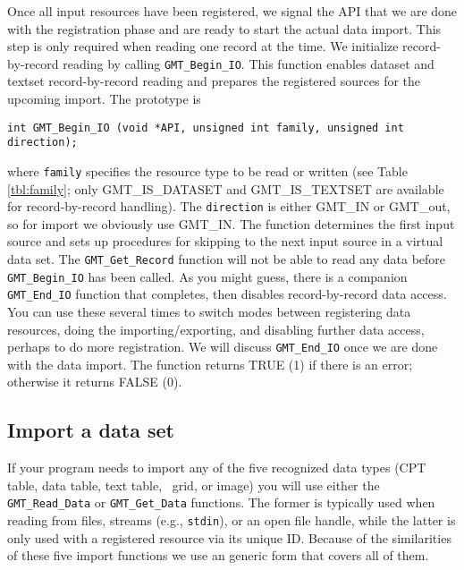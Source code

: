 \documentclass[11pt]{report}
\begin{document}
Once all input resources have been registered, we signal the API that we are done with the registration
phase and are ready to start the actual data import.  This step is only required when reading one record at the
time.  We initialize record-by-record reading by calling \texttt{GMT\_Begin\_IO}.  This function enables dataset
and textset record-by-record reading and prepares the registered sources for the upcoming import.
The prototype is

\begin{verbatim}
int GMT_Begin_IO (void *API, unsigned int family, unsigned int direction);
\end{verbatim}
where \texttt{family} specifies the resource type to be read or written (see Table \ref{tbl:family};
only GMT\_IS\_DATASET and GMT\_IS\_TEXTSET are available for record-by-record handling).
The \texttt{direction} is either GMT\_IN or GMT\_out, so for import we obviously use GMT\_IN.
The function determines the first input source and sets up procedures for skipping to the next input source in a virtual data set.
The \texttt{GMT\_Get\_Record} function will not be able to read any data before \texttt{GMT\_Begin\_IO} has been called.  As you might
guess, there is a companion \texttt{GMT\_End\_IO} function that completes, then disables record-by-record data access.  You can use these several
times to switch modes between registering data resources, doing the importing/exporting, and disabling further
data access, perhaps to do more registration.  We will discuss \texttt{GMT\_End\_IO} once we are done with the data import.
The function returns TRUE (1) if there is an error; otherwise it returns FALSE (0).

\subsection{Import a data set}

If your program needs to import any of the five recognized data types (CPT table, data table, text table, \GMT\ grid, or image)
you will use either the \texttt{GMT\_Read\_Data} or \texttt{GMT\_Get\_Data} functions.  The former is typically used when
reading from files, streams (e.g., \texttt{stdin}), or an open file handle, while the latter is only used with a registered
resource via its unique ID.  Because of the similarities of these five import functions we use an generic form that covers all of them.
\end{document}
